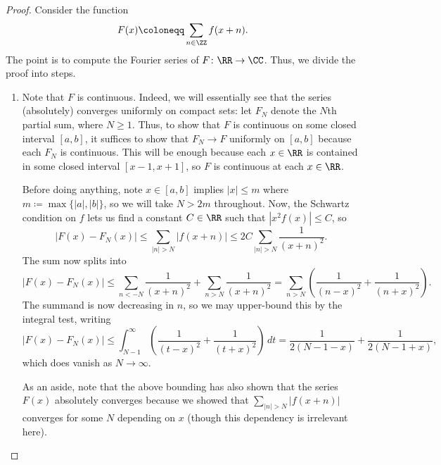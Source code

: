 \documentclass[../notes.tex]{subfiles}
\begin{document}
\begin{proof}
	Consider the function
	\[F(x)\coloneqq\sum_{n\in\ZZ}f(x+n).\]
	The point is to compute the Fourier series of $F\colon\RR\to\CC$. Thus, we divide the proof into steps.
	\begin{enumerate}
		\item Note that $F$ is continuous. Indeed, we will essentially see that the series (absolutely) converges uniformly on compact sets: let $F_N$ denote the $N$th partial sum, where $N\ge1$. Thus, to show that $F$ is continuous on some closed interval $[a,b]$, it suffices to show that $F_N\to F$ uniformly on $[a,b]$ because each $F_N$ is continuous. This will be enough because each $x\in\RR$ is contained in some closed interval $[x-1,x+1]$, so $F$ is continuous at each $x\in\RR$.

		Before doing anything, note $x\in[a,b]$ implies $|x|\le m$ where $m\coloneqq\max\{|a|,|b|\}$, so we will take $N>2m$ throughout. Now, the Schwartz condition on $f$ lets us find a constant $C\in\RR$ such that $\left|x^2f(x)\right|\le C$, so
		\[\left|F(x)-F_N(x)\right|\le\sum_{|n|>N}|f(x+n)|\le2C\sum_{|n|>N}\frac1{(x+n)^2}.\]
		The sum now splits into
		\[\left|F(x)-F_N(x)\right|\le\sum_{n<-N}\frac1{(x+n)^2}+\sum_{n>N}\frac1{(x+n)^2}=\sum_{n>N}\left(\frac1{(n-x)^2}+\frac1{(n+x)^2}\right).\]
		The summand is now decreasing in $n$, so we may upper-bound this by the integral test, writing
		\[\left|F(x)-F_N(x)\right|\le\int_{N-1}^\infty\left(\frac1{(t-x)^2}+\frac1{(t+x)^2}\right)\,dt=\frac1{2(N-1-x)}+\frac1{2(N-1+x)},\]
		which does vanish as $N\to\infty$.

		As an aside, note that the above bounding has also shown that the series $F(x)$ absolutely converges because we showed that $\sum_{|n|>N}|f(x+n)|$ converges for some $N$ depending on $x$ (though this dependency is irrelevant here).


\end{enumerate}
\end{proof}
\end{document}
